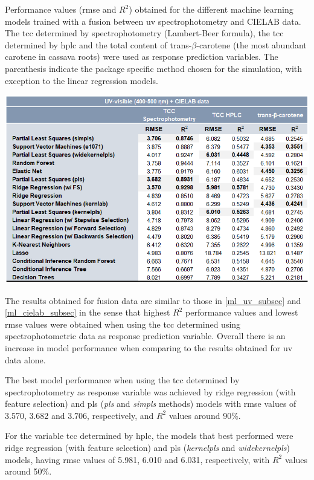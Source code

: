 \begin{table}[h]
	\centering
	\caption{Performance values (\gls{rmse} and $R^{2}$) obtained for the different machine learning models trained with a fusion between \gls{uv} spectrophotometry and CIELAB data. The \gls{tcc} determined by spectrophotometry (Lambert-Beer formula), the \gls{tcc} determined by \gls{hplc} and the total content of trans-$\beta$-carotene (the most abundant carotene in cassava roots) were used as response prediction variables. The parenthesis indicate the package specific method chosen for the simulation, with exception to the linear regression models.}	
	\includegraphics[width=1\linewidth]{Imagens/Case_study/UV_cielab_table}
	\label{UV_cielab_table}	
\end{table}


The results obtained for fusion data are similar to those in \autoref{ml_uv_subsec} and \autoref{ml_cielab_subsec} in the sense that highest $R^{2}$ performance values and lowest \gls{rmse} values were obtained when using the \gls{tcc} determined using spectrophotometric data as response prediction variable. Overall there is an increase in model performance when comparing to the results obtained for \gls{uv} data alone.

The best model performance when using the \gls{tcc} determined by spectrophotometry as response variable was achieved by ridge regression (with feature selection) and \gls{pls} (\textit{pls} and \textit{simpls} methods) models with \gls{rmse} values of 3.570, 3.682 and 3.706, respectively, and $R^{2}$ values around 90\%.

For the variable \gls{tcc} determined by \gls{hplc}, the models that best performed were ridge regression (with feature selection) and \gls{pls} (\textit{kernelpls} and \textit{widekernelpls}) models, having \gls{rmse} values of 5.981, 6.010 and 6.031, respectively, with $R^{2}$ values around 50\%.

